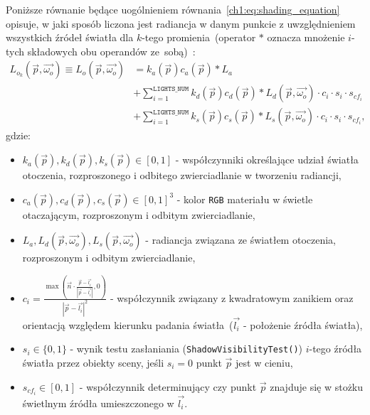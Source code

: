 \begin{enumerate}
Poniższe równanie będące uogólnieniem równania~\eqref{ch1:eq:shading_equation} opisuje, w jaki sposób liczona jest radiancja w danym punkcie z uwzględnieniem wszystkich źródeł światła dla $k$-tego promienia~(operator $*$ oznacza mnożenie $i$-tych składowych obu operandów ze~sobą)~\cite{RTFTGU}:
\begin{align}
\label{ch3:eq:shading_equation_general}
L_{o_k}(\vec{p}, \vec{\omega_o}) \equiv L_o(\vec{p}, \vec{\omega_o}) &= k_a(\vec{p})c_a(\vec{p}) * L_a\nonumber\\
&+ \sum_{i=1}^{\mathtt{LIGHTS\_NUM}} k_d(\vec{p})c_d(\vec{p}) * L_d(\vec{p}, \vec{\omega_o}) \cdot c_i\cdot s_i\cdot s_{cf_i} \nonumber\\
&+ \sum_{i=1}^{\mathtt{LIGHTS\_NUM}} k_s(\vec{p})c_s(\vec{p}) * L_s(\vec{p}, \vec{\omega_o}) \cdot c_i\cdot s_i\cdot s_{cf_i},
\end{align}
gdzie:
\begin{itemize}
\item $k_a(\vec{p}), k_d(\vec{p}), k_s(\vec{p}) \in [0, 1]$ - współczynniki określające udział światła otoczenia, rozproszonego i odbitego zwierciadlanie w tworzeniu radiancji,
\item $c_a(\vec{p}), c_d(\vec{p}), c_s(\vec{p}) \in [0, 1]^3$ - kolor \texttt{RGB} materiału w świetle otaczającym, rozproszonym i odbitym zwierciadlanie,
\item $L_a, L_d(\vec{p}, \vec{\omega_o}), L_s(\vec{p}, \vec{\omega_o})$ - radiancja związana ze światłem otoczenia, rozproszonym i odbitym zwierciadlanie,
\item $c_i = \frac{\max\left(\vec{n} \cdot \frac{\vec{p} - \vec{l_i}}{|\vec{p} - \vec{l_i}|}  , 0\right)}{|\vec{p} - \vec{l_i}|^2} $ - współczynnik związany z kwadratowym zanikiem oraz orientacją względem kierunku padania światła~($\vec{l_i}$ - położenie źródła światła),
\item $s_i\in\lbrace 0, 1 \rbrace$ - wynik testu zasłaniania (\texttt{ShadowVisibilityTest()}) $i$-tego źródła światła przez obiekty sceny, jeśli $s_i=0$ punkt $\vec{p}$ jest w cieniu,
\item $s_{cf_i}\in[0, 1]$ - współczynnik determinujący czy punkt $\vec{p}$ znajduje się w stożku świetlnym źródła umieszczonego w $\vec{l_i}$.
\end{itemize}


\end{enumerate}
